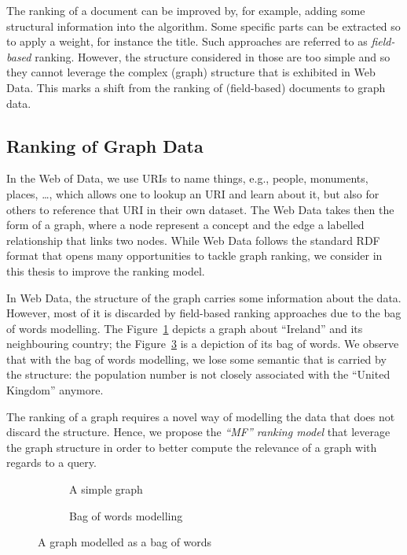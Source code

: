 The ranking of a document can be improved by, for example, adding some structural information into the algorithm. Some specific parts can be extracted so to apply a weight, for instance the title. Such approaches are referred to as \emph{\gls{field}-based} ranking. However, the structure considered in those are too simple and so they cannot leverage the complex (graph) structure that is exhibited in Web Data. This marks a shift from the ranking of (\gls{field}-based) documents to graph data.

\subsection{Ranking of Graph Data}

In the Web of Data, we use URIs to name things, e.g., people, monuments, places, \ldots, which allows one to lookup an URI and learn about it, but also for others to reference that URI in their own dataset. The Web Data takes then the form of a graph, where a node represent a concept and the edge a labelled relationship that links two nodes.
While Web Data follows the standard RDF format that opens many opportunities to tackle graph ranking, we consider in this thesis to improve the ranking model.

In Web Data, the structure of the graph carries some information about the data. However, most of it is discarded by \gls{field}-based ranking approaches due to the bag of words modelling. The Figure~\ref{fig:bow-graph} depicts a  graph about ``Ireland'' and its neighbouring country; the Figure~\ref{fig:bow} is a depiction of its bag of words. We observe that with the bag of words modelling, we lose some semantic that is carried by the structure: the population number is not closely associated with the ``United Kingdom'' anymore.

The ranking of a graph requires a novel way of modelling the data that does not discard the structure.
Hence, we propose the \emph{``MF'' ranking model} that leverage the graph structure in order to better compute the relevance of a graph with regards to a query.

\begin{figure}
	\centering
	\begin{subfigure}[b]{0.45\textwidth}
		\centering
		\resizebox{\textwidth}{!}{
			
		}
		\caption{A simple graph}
		\label{fig:bow-graph}
	\end{subfigure}
	\qquad
	\begin{subfigure}[b]{0.45\textwidth}
		\centering
		\resizebox{\textwidth}{!}{
			
		}
		\caption{Bag of words modelling}
		\label{fig:bow}
	\end{subfigure}
	\caption{A graph modelled as a bag of words}
\end{figure}

